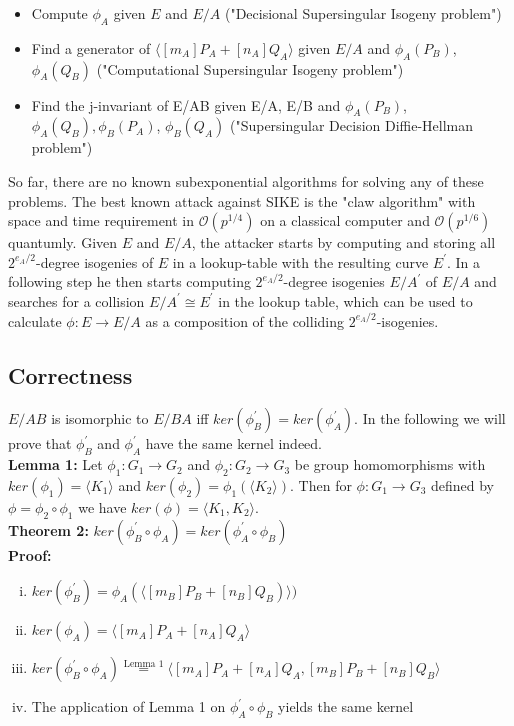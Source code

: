 	\begin{itemize}[\textbullet]
		\item Compute $\phi_A$ given $E$ and $E/A$ ("Decisional Supersingular Isogeny problem")
		\item Find a generator  of $\langle[m_A]P_A + [n_A]Q_A\rangle$ given $E/A$ and $\phi_A(P_B)$, $\phi_A(Q_B)$ ("Computational Supersingular Isogeny problem")
		\item Find the j-invariant of E/AB given E/A, E/B and $\phi_A(P_B)$, $\phi_A(Q_B),\phi_B(P_A)$, $\phi_B(Q_A)$ ("Supersingular Decision Diffie-Hellman problem")
	\end{itemize}

So far, there are no known subexponential algorithms for solving any of these problems. The best known attack against SIKE is the "claw algorithm" with space and time requirement in $\mathcal{O}(p^{1/4})$ on a classical computer and $\mathcal{O}(p^{1/6})$ quantumly. Given $E$ and $E/A$, the attacker starts by computing and storing all $2^{e_A/2}$-degree isogenies of $E$ in a lookup-table with the resulting curve $E^{\prime}$. In a following step he then starts computing $2^{e_A/2}$-degree isogenies $E/A^{\prime}$ of $E/A$ and searches for a collision $E/A^{\prime} \cong E^{\prime}$ in the lookup table, which can be used to calculate $\phi:E \to E/A$ as a composition of the colliding $2^{e_A/2}$-isogenies.


\subsection{Correctness}
\label{ch:correctness}

$E/AB$ is isomorphic to $E/BA$ iff $ker(\phi_B^{\prime})=ker(\phi_A^{\prime})$. %
In the following we will prove that $\phi_B^{\prime}$ and $\phi_A^{\prime}$ have the same kernel indeed.\\

\textbf{Lemma 1:} Let $\phi_1: G_1 \to G_2$ and $\phi_2: G_2 \to G_3$ be group homomorphisms with $ker(\phi_1) = \langle K_1 \rangle$ and $ker(\phi_2) = \phi_1(\langle K_2 \rangle)$. Then for $\phi:G_1 \to G_3$ defined by $\phi=\phi_2 \circ \phi_1$ we have $ker(\phi) =\langle K_1,K_2\rangle$.\\%

\textbf{Theorem 2:} $ker(\phi_B^{\prime} \circ \phi_A) = ker(\phi_A^{\prime} \circ \phi_B)$\\
\textbf{Proof:}
\begin{enumerate}[(i)]
	\item $ker(\phi_B^{\prime})=\phi_A(\langle [m_B]P_B + [n_B]Q_B)\rangle)$
	\item $ker(\phi_A)=\langle [m_A]P_A + [n_A]Q_A\rangle$
	\item $ker(\phi_B^{\prime} \circ \phi_A) \stackrel{\text{Lemma 1}}{=} \langle [m_A]P_A + [n_A]Q_A, [m_B]P_B + [n_B]Q_B \rangle$
	\item The application of Lemma 1 on $\phi_A^{\prime} \circ \phi_B$ yields the same kernel
\end{enumerate}



